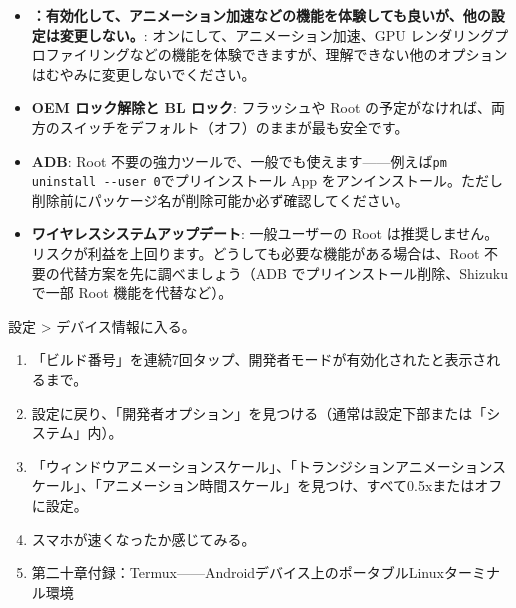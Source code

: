 \begin{itemize}
  \item \textbf{：有効化して、アニメーション加速などの機能を体験しても良いが、他の設定は変更しない。}: オンにして、アニメーション加速、GPU レンダリングプロファイリングなどの機能を体験できますが、理解できない他のオプションはむやみに変更しないでください。
  \item \textbf{OEM ロック解除と BL ロック}: フラッシュや Root の予定がなければ、両方のスイッチをデフォルト（オフ）のままが最も安全です。
  \item \textbf{ADB}: Root 不要の強力ツールで、一般でも使えます——例えば\texttt{pm uninstall -\allowbreak -\allowbreak user 0}でプリインストール App をアンインストール。ただし削除前にパッケージ名が削除可能か必ず確認してください。
  \item \textbf{ワイヤレスシステムアップデート}: 一般ユーザーの Root は推奨しません。リスクが利益を上回ります。どうしても必要な機能がある場合は、Root 不要の代替方案を先に調べましょう（ADB でプリインストール削除、Shizuku で一部 Root 機能を代替など）。
\end{itemize}

\begin{tcbpractice}{設定 > デバイス情報に入る。}
\begin{enumerate}
  \item 「ビルド番号」を連続7回タップ、開発者モードが有効化されたと表示されるまで。
  \item 設定に戻り、「開発者オプション」を見つける（通常は設定下部または「システム」内）。
  \item 「ウィンドウアニメーションスケール」、「トランジションアニメーションスケール」、「アニメーション時間スケール」を見つけ、すべて0.5xまたはオフに設定。
  \item スマホが速くなったか感じてみる。
  \item 第二十章付録：Termux——Androidデバイス上のポータブルLinuxターミナル環境
\end{enumerate}

\end{tcbpractice}
